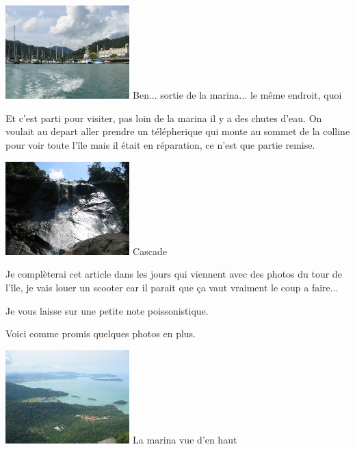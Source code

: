 \begin{multicols}{2}
\hspace*{-0.65cm}
\includegraphics[width=4.8cm]{articles/langkawi/1211018457DniB.jpg}
Ben... sortie de la marina... le même endroit, quoi

Et c'est parti pour visiter, pas loin de la marina il y a des chutes d'eau. On voulait au depart aller prendre un télépherique qui monte au sommet de la colline pour voir toute l'île mais il était en réparation, ce n'est que partie remise.

\hspace*{-0.65cm}
\includegraphics[width=4.8cm]{articles/langkawi/1211018190Pmip.jpg}
Cascade

Je complèterai cet article dans les jours qui viennent avec des photos du tour de l'île, je vais louer un scooter car il parait que ça vaut vraiment le coup a faire...

Je vous laisse sur une petite note poissonistique.


Voici comme promis quelques photos en plus.

\hspace*{-0.65cm}
\includegraphics[width=4.8cm]{articles/langkawi/1212397933wQ6v.jpg}
La marina vue d'en haut


\end{multicols}

